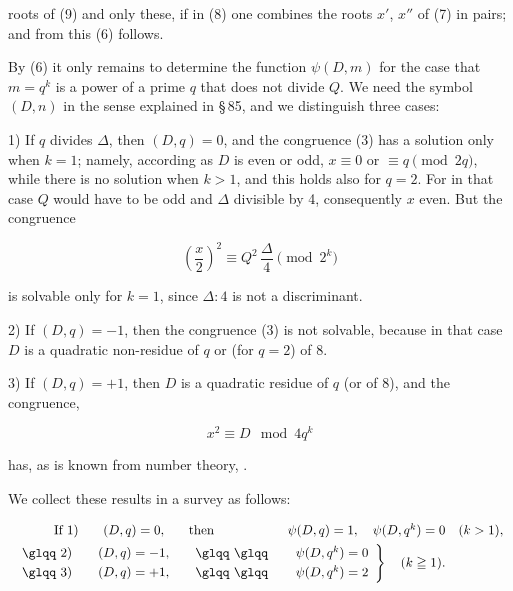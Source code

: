 roots of (9) and only these, if in (8) one combines the roots
$x'$, $x''$ of (7) in pairs; and from this (6) follows.

By (6) it only remains to determine the function $\psi(D,m)$ for the
case that $m=q^k$ is a power of a prime $q$ that does not
divide $Q$. We need the symbol $(D,n)$ in
the sense explained in \S\,85, and we distinguish three cases:

1) If $q$ divides $\Delta$, then $(D,q)=0$, and the congruence
 (3) has a solution only when $k=1$; namely, according
as $D$ is even or odd, $x\equiv 0$ or $\equiv q \pmod{2q}$,
while there is no solution when $k>1$, and this holds also for
$q=2$. For in that case $Q$ would have to be odd and $\Delta$ divisible by 4,
consequently $x$ even. But the congruence

\[ \left(\frac{x}{2}\right)^2 \equiv Q^2\,\frac{\Delta}{4} \pmod{2^k} \]

is solvable only for $k=1$, since $\Delta:4$ is not a discriminant.

2) If $(D,q)=-1$, then the congruence (3) is not solvable,
because in that case $D$ is a quadratic non-residue of $q$ or (for $q=2$)
of 8.

3) If $(D,q)=+1$, then $D$ is a quadratic residue of $q$
(or of 8), and the congruence,

\[ x^2 \equiv D \mod 4q^k \]

has, as is known from number theory, .

We collect these results in a survey as follows:

\[
\begin{array}{rcll}
\text{If }1) & (D,q)=0, & \text{then} & \psi(D,q)=1,\quad\psi(D,q^k)=0\quad(k>1),\\[0.4em]
\begin{array}{r}\text{\glqq\ }2)\\[0.3em]\text{\glqq\ }3)\end{array}
& \begin{array}{l}(D,q)=-1,\\[0.3em](D,q)=+1,\end{array}
& \begin{array}{c}\text{\glqq\ \glqq}\\[0.3em]\text{\glqq\ \glqq}\end{array}
& \left.\begin{array}{l}\psi(D,q^k)=0\\[0.3em]\psi(D,q^k)=2\end{array}\right\}\quad(k\geqq 1).
\end{array}
\]

